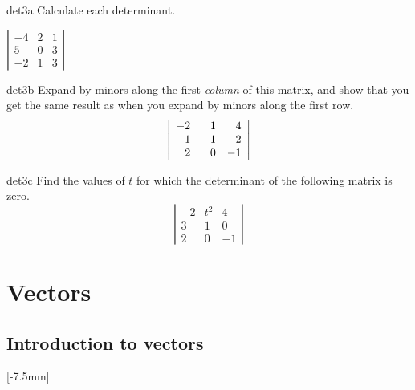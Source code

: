 \documentclass[svgnames]{report}
\begin{document}
\begin{exercise}{}{det3a} \setcounter{subitm}{1}
  Calculate each determinant. 

{$\left|\begin{array}{ccc} -4 & 2 & 1 \\ 5 & 0 & 3 \\ -2 & 1 & 3 \end{array}\right|$}
\end{exercise}

\begin{exercise}{}{det3b}
  Expand by minors along the first \textit{column} of this matrix, and show that you get the same result as when you expand by minors along the first row. 
  \[
    \left|\begin{array}{ccc} -2 & \hphantom{-}1 & \hphantom{-}4 \\  \hphantom{-}1 & \hphantom{-}1 & \hphantom{-}2 \\ \hphantom{-}2 & \hphantom{-}0  & -1 \end{array}\right|
  \]
\end{exercise}

\begin{exercise}{}{det3c}
  Find the values of $t$ for which the determinant of the following matrix is zero.  
  \[
    \left|\begin{array}{ccc} -2 & t^2 & 4 \\  3 & 1 & 0 \\ 2 & 0  & -1 \end{array}\right|
  \]
\end{exercise}


\chapter{Vectors}

\section{Introduction to vectors}

[-7.5mm]
\end{document}
